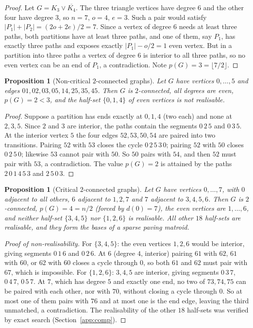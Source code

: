 \documentclass[11pt]{amsart}
\newtheorem{proposition}[theorem]{Proposition}
\theoremstyle{definition}
\begin{document}
\begin{proof}
Let $G=K_3\vee\overline{K_4}$. The three triangle vertices have degree $6$ and the other four have
degree $3$, so $n=7$, $o=4$, $e=3$. Such a pair would satisfy $|P_1|+|P_2|=(2o+2e)/2=7$. Since a
vertex of degree $6$ needs at least three paths, both partitions have at least three paths, and one of
them, say $P_1$, has exactly three paths and exposes exactly $|P_1|-o/2=1$ even vertex. But in a
partition into three paths a vertex of degree $6$ is interior to all three paths, so no even vertex can
be an end of $P_1$, a contradiction. Note $p(G)=3=\lfloor 7/2\rfloor$.
\end{proof}

\begin{proposition}[Non-critical $2$-connected graphs]\label{prop:uhcstar}
Let $G$ have vertices $0,\dots,5$ and edges $01,02,03,05,14,25,35,45$. Then $G$ is $2$-connected, all
degrees are even, $p(G)=2<3$, and the half-set $\{0,1,4\}$ of even vertices is not realisable.
\end{proposition}

\begin{proof}
Suppose a partition has ends exactly at $0,1,4$ (two each) and none at $2,3,5$. Since $2$ and $3$
are interior, the paths contain the segments $0\,2\,5$ and $0\,3\,5$. At the interior vertex $5$ the
four edges $52,53,50,54$ are paired into two transitions. Pairing $52$ with $53$ closes the cycle
$0\,2\,5\,3\,0$; pairing $52$ with $50$ closes $0\,2\,5\,0$; likewise $53$ cannot pair with $50$. So
$50$ pairs with $54$, and then $52$ must pair with $53$, a contradiction. The value $p(G)=2$ is
attained by the paths $2\,0\,1\,4\,5\,3$ and $2\,5\,0\,3$.
\end{proof}

\begin{proposition}[Critical $2$-connected graphs]\label{prop:uhc}
Let $G$ have vertices $0,\dots,7$, with $0$ adjacent to all others, $6$ adjacent to $1,2,7$ and $7$
adjacent to $3,4,5,6$. Then $G$ is $2$-connected, $p(G)=4=n/2$ (forced by $d(0)=7$), the even vertices
are $1,\dots,6$, and neither half-set $\{3,4,5\}$ nor $\{1,2,6\}$ is realisable. All other $18$
half-sets are realisable, and they form the bases of a sparse paving matroid.
\end{proposition}

\begin{proof}[Proof of non-realisability]
For $\{3,4,5\}$: the even vertices $1,2,6$ would be interior, giving segments $0\,1\,6$ and $0\,2\,6$.
At $6$ (degree $4$, interior) pairing $61$ with $62$, $61$ with $60$, or $62$ with $60$ closes a
cycle through $0$, so both $61$ and $62$ must pair with $67$, which is impossible. For $\{1,2,6\}$:
$3,4,5$ are interior, giving segments $0\,3\,7$, $0\,4\,7$, $0\,5\,7$. At $7$, which has degree $5$ and
exactly one end, no two of $73,74,75$ can be paired with each other, nor with $70$, without closing a
cycle through $0$. So at most one of them pairs with $76$ and at most one is the end edge, leaving the
third unmatched, a contradiction.
The realisability of the other $18$ half-sets was verified by exact search (Section~\ref{app:comp}).
\end{proof}
\end{document}
